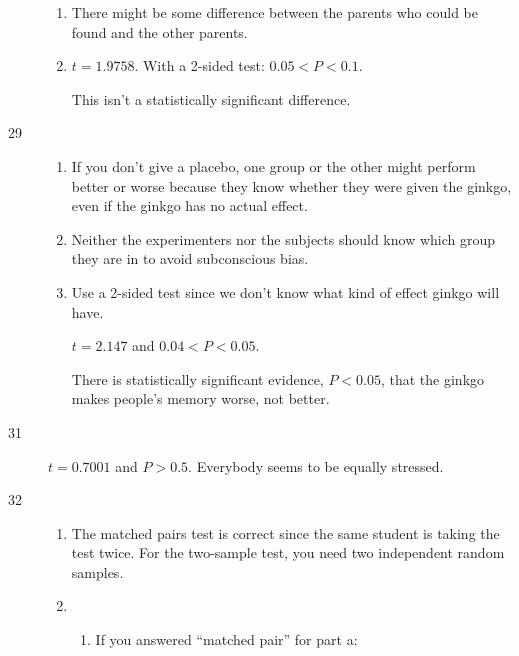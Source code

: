 \documentclass[letterpaper, landscape]{exam}
\begin{document}
\begin{description}
\begin{enumerate}[label = {(\alph*)}]
          \item There might be some difference between the parents who could be
            found and the other parents.

          \item $t = 1.9758$. With a 2-sided test: $0.05 < P < 0.1$.

            This isn't a statistically significant difference.

        \end{enumerate}

      \item[29]
        \begin{enumerate}[label = {(\alph*)}]
          \item If you don't give a placebo, one group or the other might
            perform better or worse because they know whether they were given
            the ginkgo, even if the ginkgo has no actual effect.

          \item Neither the experimenters nor the subjects should know which
            group they are in to avoid subconscious bias.

          \item 
            Use a 2-sided test since we don't know what kind of effect ginkgo will
            have.

            $t = 2.147$ and $0.04  < P < 0.05$. 

            There is statistically significant evidence, $P < 0.05$, that the
            ginkgo makes people's memory worse, not better.

        \end{enumerate}

      \item[31] $t = 0.7001$ and $P > 0.5$. Everybody seems to be equally
        stressed.

      \item[32]
        \begin{enumerate}[label = {(\alph*)}]
          \item The matched pairs test is correct since the same student is
            taking the test twice. For the two-sample test, you need two
            independent random samples.

          \item 
            \begin{enumerate}[label = (\roman*)]
              \item If you answered ``matched pair'' for part a:


\end{enumerate}
\end{enumerate}
\end{description}
\end{document}

